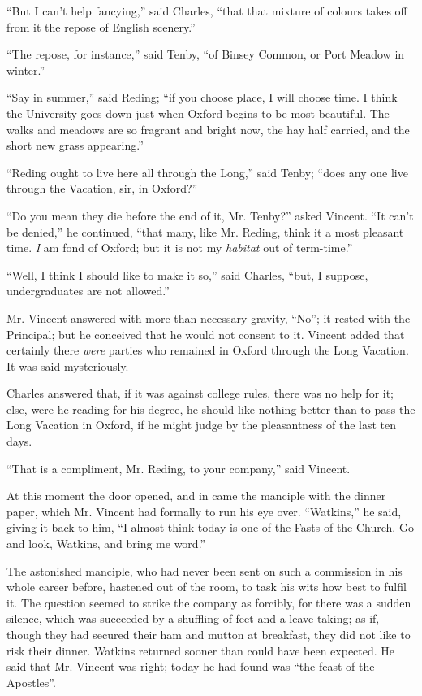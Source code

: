 ``But I can't help fancying,'' said Charles, ``that
that mixture of colours takes off from it the repose of English
scenery.''

``The repose, for instance,'' said Tenby, ``of Binsey
Common, or Port Meadow in winter.''

``Say in summer,'' said Reding; ``if you choose place,
I will choose time. I think the University goes down just when Oxford
begins to be most beautiful. The walks and meadows are so fragrant and
bright now, the hay half carried, and the short new grass
appearing.''

``Reding ought to live here all through the Long,'' said Tenby; ``does any one live through the Vacation, sir, in
Oxford?''

``Do you mean they die before the end of it, Mr. Tenby?''
asked Vincent. ``It can't be denied,'' he continued,
``that many, like Mr. Reding, think it a most pleasant time. \emph{I}
am fond of Oxford; but it is not my \emph{habitat} out of
term-time.''

``Well, I think I should like to make it so,'' said
Charles, ``but, I suppose, undergraduates are not allowed.''

Mr. Vincent answered with more than necessary gravity,
``No''; it rested with the Principal; but he conceived that he
would not consent to it. Vincent added that certainly there \emph{were}
parties who remained in Oxford through the Long Vacation. It was said
mysteriously.

Charles answered that, if it was against college rules, there was
no help for it; else, were he reading for his degree, he should like
nothing better than to pass the Long Vacation in Oxford, if he might
judge by the pleasantness of the last ten days.

``That is a compliment, Mr. Reding, to your company,'' said
Vincent.

At this moment the door opened, and in came the manciple with the
dinner paper, which Mr. Vincent had formally to run his eye over.
``Watkins,'' he said, giving it back to him, ``I almost
think today is one of the Fasts of the Church. Go and look, Watkins,
and bring me word.''

The astonished manciple, who had never been sent on such a
commission in his whole career before, hastened out of the room,
to task his wits how best to fulfil it. The question seemed to strike
the company as forcibly, for there was a sudden silence, which was
succeeded by a shuffling of feet and a leave-taking; as if, though
they had secured their ham and mutton at breakfast, they did not like
to risk their dinner. Watkins returned sooner than could have been
expected. He said that Mr. Vincent was right; today he had found was
``the feast of the Apostles''.

